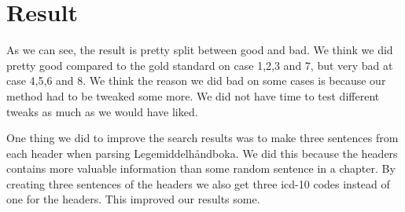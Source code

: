 \chapter{Result}
\label{cha:result}

As we can see, the result is pretty split between good and bad. We think we did
pretty good compared to the gold standard on case 1,2,3 and 7, but very bad at
case 4,5,6 and 8. We think the reason we did bad on some cases is because our
method had to be tweaked some more. We did not have time to test different
tweaks as much as we would have liked.

One thing we did to improve the search results was to make three sentences from
each header when parsing Legemiddelhåndboka. We did this because the headers
contains more valuable information than some random sentence in a chapter. By
creating three sentences of the headers we also get three icd-10 codes instead
of one for the headers. This improved our results some.

